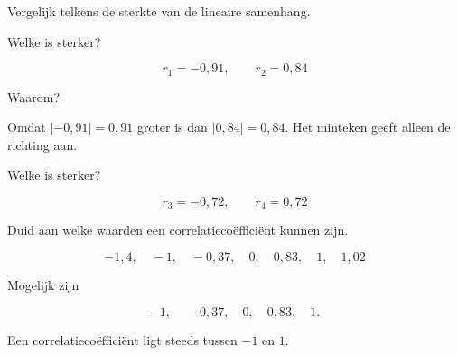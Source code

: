 \documentclass{ximera}
\begin{document}
\begin{oefening}{\oefB \ESS}

Vergelijk telkens de sterkte van de lineaire samenhang.

\begin{question}
Welke is sterker?

\[
r_1=-0{,}91,
\qquad
r_2=0{,}84
\]

\begin{multipleChoice}
\end{multipleChoice}
\end{question}

\begin{question}
Waarom?

\begin{oplossing}
Omdat $|-0{,}91|=0{,}91$ groter is dan $|0{,}84|=0{,}84$.
Het minteken geeft alleen de richting aan.
\end{oplossing}
\end{question}

\begin{question}
Welke is sterker?

\[
r_3=-0{,}72,
\qquad
r_4=0{,}72
\]

\begin{multipleChoice}
\end{multipleChoice}
\end{question}
\end{oefening}


\begin{oefening}{\oefB \ESS}

Duid aan welke waarden een correlatiecoëfficiënt kunnen zijn.

\[
-1{,}4,\quad -1,\quad -0{,}37,\quad 0,\quad 0{,}83,\quad 1,\quad 1{,}02
\]

\begin{oplossing}
Mogelijk zijn

\[
-1,\quad -0{,}37,\quad 0,\quad 0{,}83,\quad 1.
\]

Een correlatiecoëfficiënt ligt steeds tussen $-1$ en $1$.
\end{oplossing}
\end{oefening}
\end{document}
